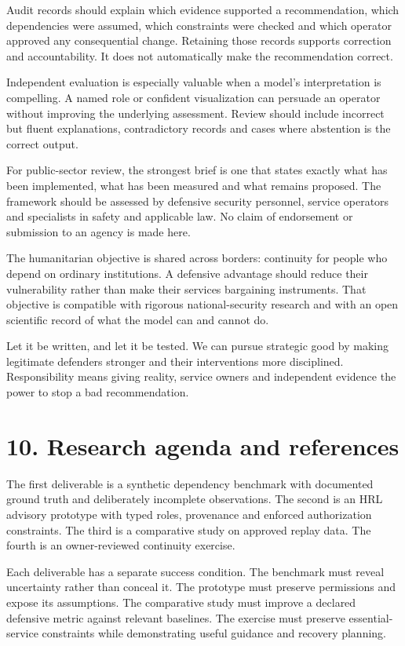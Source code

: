 \documentclass[11pt]{article}
\begin{document}
Audit records should explain which evidence supported a recommendation, which dependencies were assumed, which constraints were checked and which operator approved any consequential change. Retaining those records supports correction and accountability. It does not automatically make the recommendation correct.

Independent evaluation is especially valuable when a model's interpretation is compelling. A named role or confident visualization can persuade an operator without improving the underlying assessment. Review should include incorrect but fluent explanations, contradictory records and cases where abstention is the correct output.

For public-sector review, the strongest brief is one that states exactly what has been implemented, what has been measured and what remains proposed. The framework should be assessed by defensive security personnel, service operators and specialists in safety and applicable law. No claim of endorsement or submission to an agency is made here.

The humanitarian objective is shared across borders: continuity for people who depend on ordinary institutions. A defensive advantage should reduce their vulnerability rather than make their services bargaining instruments. That objective is compatible with rigorous national-security research and with an open scientific record of what the model can and cannot do.

Let it be written, and let it be tested. We can pursue strategic good by making legitimate defenders stronger and their interventions more disciplined. Responsibility means giving reality, service owners and independent evidence the power to stop a bad recommendation.

\clearpage
\section*{10. Research agenda and references}
The first deliverable is a synthetic dependency benchmark with documented ground truth and deliberately incomplete observations. The second is an HRL advisory prototype with typed roles, provenance and enforced authorization constraints. The third is a comparative study on approved replay data. The fourth is an owner-reviewed continuity exercise.

Each deliverable has a separate success condition. The benchmark must reveal uncertainty rather than conceal it. The prototype must preserve permissions and expose its assumptions. The comparative study must improve a declared defensive metric against relevant baselines. The exercise must preserve essential-service constraints while demonstrating useful guidance and recovery planning.
\end{document}
